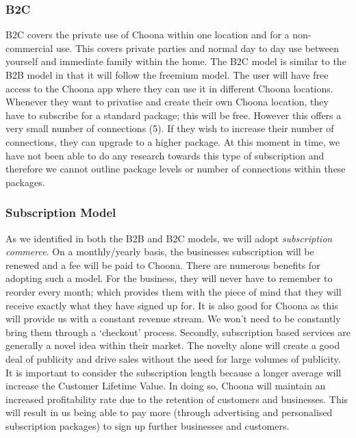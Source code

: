 \subsubsection{B2C}
B2C covers the private use of Choona within one location and for a non-commercial use.  This covers private parties and normal day to day use between yourself and immediate family within the home.  The B2C model is similar to the B2B model in that it will follow the freemium model.  The user will have free access to the Choona app where they can use it in different Choona locations.  Whenever they want to privatise and create their own Choona location, they have to subscribe for a standard package; this will be free.  However this offers a very small number of connections (5).  If they wish to increase their number of connections, they can upgrade to a higher package.  At this moment in time, we have not been able to do any research towards this type of subscription and therefore we cannot outline package levels or number of connections within these packages.  \\

\subsubsection{Subscription Model}
As we identified in both the B2B and B2C models, we will adopt \emph{subscription commerce}.  On a monthly/yearly basis, the businesses subscription will be renewed and a fee will be paid to Choona.  There are numerous benefits for adopting such a model.  For the business, they will never have to remember to reorder every month; which provides them with the piece of mind that they will receive exactly what they have signed up for.  It is also good for Choona as this will provide us with a constant revenue stream.  We won't need to be constantly bring them through a `checkout' process. 
Secondly, subscription based services are generally a novel idea within their market.  The novelty alone will create a good deal of publicity and drive sales without the need for large volumes of publicity.  \\
It is important to consider the subscription length because a longer average will increase the Customer Lifetime Value.  In doing so, Choona will maintain an increased profitability rate due to the retention of customers and businesses.  This will result in us being able to pay more (through advertising and personalised subscription packages) to sign up further businesses and customers.\\
